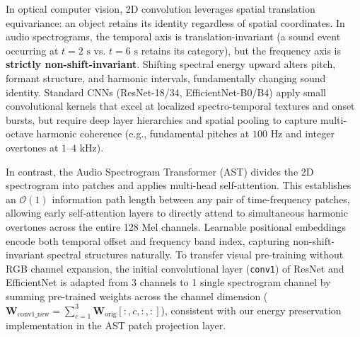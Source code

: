 \documentclass[11pt,a4paper]{article}
\begin{document}
In optical computer vision, 2D convolution leverages spatial translation equivariance: an object retains its identity regardless of spatial coordinates. In audio spectrograms, the temporal axis is translation-invariant (a sound event occurring at $t=2\text{ s}$ vs. $t=6\text{ s}$ retains its category), but the frequency axis is \textbf{strictly non-shift-invariant}. Shifting spectral energy upward alters pitch, formant structure, and harmonic intervals, fundamentally changing sound identity. Standard CNNs (ResNet-18/34, EfficientNet-B0/B4) apply small convolutional kernels that excel at localized spectro-temporal textures and onset bursts, but require deep layer hierarchies and spatial pooling to capture multi-octave harmonic coherence (e.g., fundamental pitches at $100\text{ Hz}$ and integer overtones at $1\text{--}4\text{ kHz}$).

In contrast, the Audio Spectrogram Transformer (AST) divides the 2D spectrogram into patches and applies multi-head self-attention. This establishes an $\mathcal{O}(1)$ information path length between any pair of time-frequency patches, allowing early self-attention layers to directly attend to simultaneous harmonic overtones across the entire 128 Mel channels. Learnable positional embeddings encode both temporal offset and frequency band index, capturing non-shift-invariant spectral structures naturally. To transfer visual pre-training without RGB channel expansion, the initial convolutional layer (\texttt{conv1}) of ResNet and EfficientNet is adapted from 3 channels to 1 single spectrogram channel by summing pre-trained weights across the channel dimension ($\mathbf{W}_{\text{conv1\_new}} = \sum_{c=1}^3 \mathbf{W}_{\text{orig}}[:, c, :, :]$), consistent with our energy preservation implementation in the AST patch projection layer.
\end{document}
